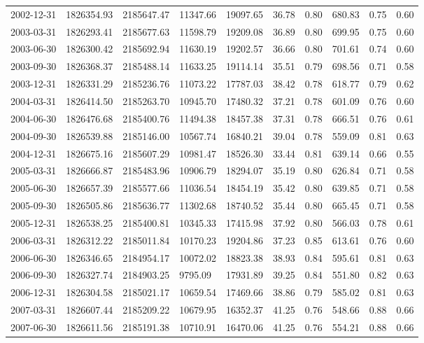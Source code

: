\begin{landscape}
\begin{longtable}{llllllllll}
2002-12-31 & 1826354.93 & 2185647.47 & 11347.66 & 19097.65 & 36.78 & 0.80 & 680.83 & 0.75 & 0.60 \\
2003-03-31 & 1826293.41 & 2185677.63 & 11598.79 & 19209.08 & 36.89 & 0.80 & 699.95 & 0.75 & 0.60 \\
2003-06-30 & 1826300.42 & 2185692.94 & 11630.19 & 19202.57 & 36.66 & 0.80 & 701.61 & 0.74 & 0.60 \\
2003-09-30 & 1826368.37 & 2185488.14 & 11633.25 & 19114.14 & 35.51 & 0.79 & 698.56 & 0.71 & 0.58 \\
2003-12-31 & 1826331.29 & 2185236.76 & 11073.22 & 17787.03 & 38.42 & 0.78 & 618.77 & 0.79 & 0.62 \\
2004-03-31 & 1826414.50 & 2185263.70 & 10945.70 & 17480.32 & 37.21 & 0.78 & 601.09 & 0.76 & 0.60 \\
2004-06-30 & 1826476.68 & 2185400.76 & 11494.38 & 18457.38 & 37.31 & 0.78 & 666.51 & 0.76 & 0.61 \\
2004-09-30 & 1826539.88 & 2185146.00 & 10567.74 & 16840.21 & 39.04 & 0.78 & 559.09 & 0.81 & 0.63 \\
2004-12-31 & 1826675.16 & 2185607.29 & 10981.47 & 18526.30 & 33.44 & 0.81 & 639.14 & 0.66 & 0.55 \\
2005-03-31 & 1826666.87 & 2185483.96 & 10906.79 & 18294.07 & 35.19 & 0.80 & 626.84 & 0.71 & 0.58 \\
2005-06-30 & 1826657.39 & 2185577.66 & 11036.54 & 18454.19 & 35.42 & 0.80 & 639.85 & 0.71 & 0.58 \\
2005-09-30 & 1826505.86 & 2185636.77 & 11302.68 & 18740.52 & 35.44 & 0.80 & 665.45 & 0.71 & 0.58 \\
2005-12-31 & 1826538.25 & 2185400.81 & 10345.33 & 17415.98 & 37.92 & 0.80 & 566.03 & 0.78 & 0.61 \\
2006-03-31 & 1826312.22 & 2185011.84 & 10170.23 & 19204.86 & 37.23 & 0.85 & 613.61 & 0.76 & 0.60 \\
2006-06-30 & 1826346.65 & 2184954.17 & 10072.02 & 18823.38 & 38.93 & 0.84 & 595.61 & 0.81 & 0.63 \\
2006-09-30 & 1826327.74 & 2184903.25 & 9795.09  & 17931.89 & 39.25 & 0.84 & 551.80 & 0.82 & 0.63 \\
2006-12-31 & 1826304.58 & 2185021.17 & 10659.54 & 17469.66 & 38.86 & 0.79 & 585.02 & 0.81 & 0.63 \\
2007-03-31 & 1826607.44 & 2185209.22 & 10679.95 & 16352.37 & 41.25 & 0.76 & 548.66 & 0.88 & 0.66 \\
2007-06-30 & 1826611.56 & 2185191.38 & 10710.91 & 16470.06 & 41.25 & 0.76 & 554.21 & 0.88 & 0.66 \\

\end{longtable}
\end{landscape}
